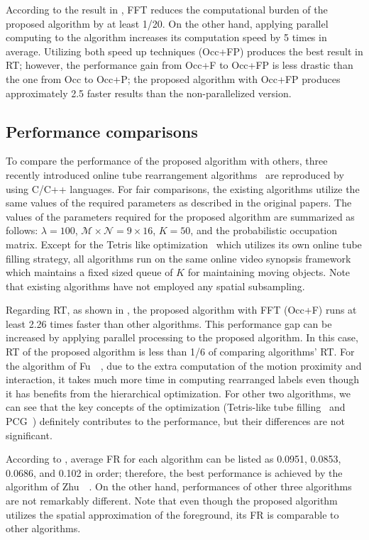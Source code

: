 \documentclass[11pt]{hyu_thesis}
\begin{document}
According to the result in , FFT reduces the computational burden of the proposed algorithm by at least 1/20. On the other hand, applying parallel computing to the algorithm increases its computation speed by 5 times in average. Utilizing both speed up techniques (Occ+FP) produces the best result in RT; however, the performance gain from Occ+F to Occ+FP is less drastic than the one from Occ to Occ+P; the proposed algorithm with Occ+FP produces approximately 2.5 faster results than the non-parallelized version.

\subsection{Performance comparisons}
\label{sec:exp:comparison}
To compare the performance of the proposed algorithm with others, three recently introduced online tube rearrangement algorithms~\cite{Fu2014,Zhu2015,He2017} are reproduced by using C/C++ languages. For fair comparisons, the existing algorithms utilize the same values of the required parameters as described in the original papers. The values of the parameters required for the proposed algorithm are summarized as follows: $\lambda=100$, $\mathcal{M}\times\mathcal{N}=9\times16$, $K=50$, and the probabilistic occupation matrix. Except for the Tetris like optimization~\cite{Zhu2015} which utilizes its own online tube filling strategy, all algorithms run on the same online video synopsis framework which maintains a fixed sized queue of $K$ for maintaining moving objects. Note that existing algorithms have not employed any spatial subsampling.

Regarding RT, as shown in , the proposed algorithm with FFT (Occ+F) runs at least 2.26 times faster than other algorithms. This performance gap can be increased by applying parallel processing to the proposed algorithm. In this case, RT of the proposed algorithm is less than 1/6 of comparing algorithms' RT. For the algorithm of Fu~\etal~\cite{Fu2014}, due to the extra computation of the motion proximity and interaction, it takes much more time in computing rearranged labels even though it has benefits from the hierarchical optimization. For other two algorithms, we can see that the key concepts of the optimization (Tetris-like tube filling~\cite{Zhu2015} and PCG~\cite{He2017}) definitely contributes to the performance, but their differences are not significant. 

According to , average FR for each algorithm can be listed as 0.0951, 0.0853, 0.0686, and 0.102 in order; therefore, the best performance is achieved by the algorithm of Zhu~\etal~\cite{Zhu2015}. On the other hand, performances of other three algorithms are not remarkably different. Note that even though the proposed algorithm utilizes the spatial approximation of the foreground, its FR is comparable to other algorithms.
\end{document}
